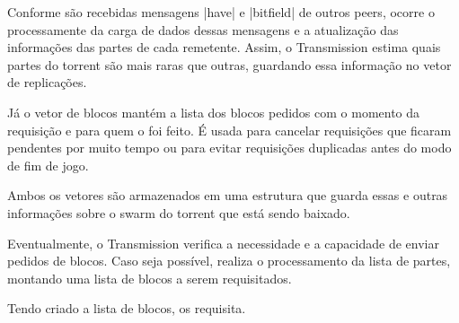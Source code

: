 
Conforme são recebidas mensagens \bverb|have| e \bverb|bitfield| de outros \glspl*{peer},
ocorre o processamente da carga de dados dessas mensagens e a atualização das
informações das partes de cada remetente. Assim, o Transmission estima quais partes do
\gls*{torrent} são mais raras que outras, guardando essa informação no vetor de
replicações.


Já o vetor de blocos mantém a lista dos blocos pedidos com o momento da requisição e
para quem o foi feito. É usada para cancelar requisições que ficaram pendentes por muito
tempo ou para evitar requisições duplicadas antes do modo de fim de jogo.


Ambos os vetores são armazenados em uma estrutura que guarda essas e outras informações
sobre o \gls*{swarm} do \gls*{torrent} que está sendo baixado.


Eventualmente, o Transmission verifica a necessidade e a capacidade de enviar pedidos
de blocos. Caso seja possível, realiza o processamento da lista de partes, montando uma
lista de blocos a serem requisitados.

\newpage
{}

\newpage
Tendo criado a lista de blocos, os requisita.

